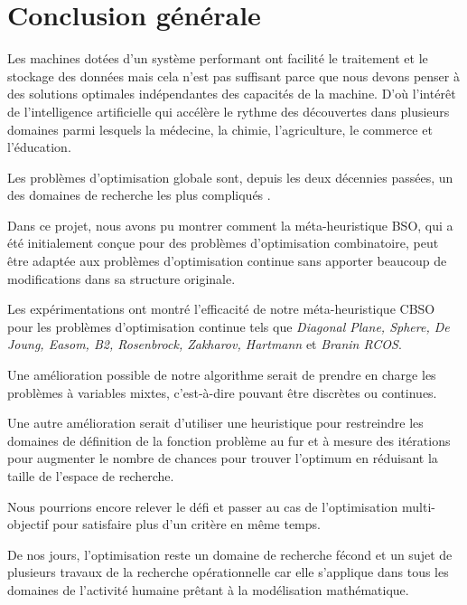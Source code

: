 \chapter*{Conclusion générale}
Les machines dotées d'un système performant ont facilité le traitement et le stockage des données mais cela n'est pas suffisant parce que nous devons penser à des solutions optimales indépendantes des capacités de la machine. D'où l'intérêt de l'intelligence artificielle qui accélère le rythme des découvertes dans plusieurs domaines parmi lesquels la médecine, la chimie, l'agriculture, le commerce et l'éducation.

Les problèmes d'optimisation globale sont, depuis les deux décennies passées, un des domaines de recherche les plus compliqués .

Dans ce projet, nous avons pu montrer comment la méta-heuristique BSO, qui a été initialement conçue pour des problèmes d'optimisation combinatoire, peut être adaptée aux problèmes d'optimisation continue sans apporter beaucoup de modifications dans sa structure originale.

Les expérimentations ont montré l'efficacité de notre méta-heuristique CBSO pour les problèmes d'optimisation continue tels que \emph{Diagonal Plane, Sphere, De Joung, Easom, B2, Rosenbrock, Zakharov, Hartmann} et \emph{Branin RCOS}.

Une amélioration possible de notre algorithme serait de prendre en charge les problèmes à variables mixtes, c'est-à-dire pouvant être discrètes ou continues.

Une autre amélioration serait d'utiliser une heuristique pour restreindre les domaines de définition de la fonction problème au fur et à mesure des itérations pour augmenter le nombre de chances pour trouver l'optimum en réduisant la taille de l'espace de recherche.

Nous pourrions encore relever le défi et passer au cas de l'optimisation multi-objectif pour satisfaire plus d'un critère en même temps.

De nos jours, l'optimisation reste un domaine de recherche fécond et un sujet de plusieurs travaux de la recherche opérationnelle car elle s'applique dans tous les domaines de l'activité humaine prêtant à la modélisation mathématique.

